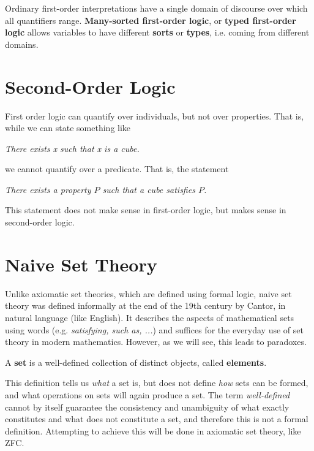 \documentclass{article}
\begin{document}
  Ordinary first-order interpretations have a single domain of discourse over which all quantifiers range. \textbf{Many-sorted first-order logic}, or \textbf{typed first-order logic} allows variables to have different \textbf{sorts} or \textbf{types}, i.e. coming from different domains. 

\section{Second-Order Logic} 

  First order logic can quantify over individuals, but not over properties. That is, while we can state something like 

  \begin{center}
    \textit{There exists x such that x is a cube.}
  \end{center} 

  we cannot quantify over a predicate. That is, the statement 
  
  \begin{center}
    \textit{There exists a property $P$ such that a cube satisfies $P$.}
  \end{center}

  This statement does not make sense in first-order logic, but makes sense in second-order logic. 
  
\section{Naive Set Theory}

    Unlike axiomatic set theories, which are defined using formal logic, naive set theory was defined informally at the end of the 19th century by Cantor, in natural language (like English). It describes the aspects of mathematical sets using words (e.g. \textit{satisfying, such as, ...}) and suffices for the everyday use of set theory in modern mathematics. However, as we will see, this leads to paradoxes. 

    \begin{definition}[Set]
      A \textbf{set} is a well-defined collection of distinct objects, called \textbf{elements}. 
    \end{definition}

    This definition tells us \textit{what} a set is, but does not define \textit{how} sets can be formed, and what operations on sets will again produce a set. The term \textit{well-defined} cannot by itself guarantee the consistency and unambiguity of what exactly constitutes and what does not constitute a set, and therefore this is not a formal definition. Attempting to achieve this will be done in axiomatic set theory, like ZFC. 
\end{document}
